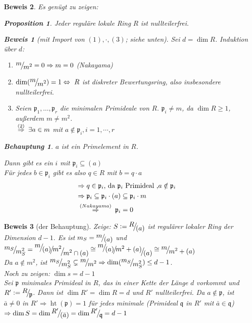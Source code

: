 \documentclass[a4paper,12pt]{report}
\theoremstyle{break}
\newtheorem{Prop}[Def]{Proposition}
\theoremstyle{nonumberbreak}
\newtheorem{Beh}{Behauptung}
\theoremstyle{nonumberplain}
\newtheorem{Bew}{Beweis}
\newcommand{\defeqr}[0]{\mathrel{\mathop:}=}
\newcommand{\folgtwegen}[1]{\ensuremath{\DOTSB\;\stackrel{#1}{\Rightarrow}\;}}
\DeclareMathOperator{\height}{ht}
\newcommand{\FakRaum}[2]{
  \raisebox{0.7ex}{\ensuremath{#1}}
  \ensuremath{\mkern-3mu}\big/\ensuremath{\mkern-3mu}
  \raisebox{-0.6ex}{\ensuremath{#2}}}
\begin{document}
\begin{Bew}
  Es genügt zu zeigen:
  \begin{Prop}
    \label{prop:17.5}
    Jeder reguläre lokale Ring $R$ ist nullteilerfrei.
  \end{Prop}
  \begin{Bew}[mit Import von $(1),\cdot,(3)$; siehe unten] Sei $d=\dim R$. Induktion über $d$: 
  \begin{enumerate}
  \item[d=0:] $\FakRaum{m}{m^2}=0\Rightarrow m=0$ (Nakayama)
  \item[d=1:] $\dim (\FakRaum{m}{m^2})=1\Leftrightarrow ~R$ ist diskreter Bewertungsring, also insbesondere nullteilerfrei.
  \item[d>1:] Seien $\mathfrak p_1,\dots,\mathfrak p_r$ die minimalen Primideale von $R$. $\mathfrak p_i\neq m$, da $\dim R\geq 1$,
    außerdem $m\neq m^2$. \\
    $\folgtwegen{(2)}\exists a\in m$ mit $a\notin \mathfrak p_i, i=1,\cdots,r$
  \end{enumerate}
  \begin{Beh}
    $a$ ist ein Primelement in $R$.
  \end{Beh}
  Dann gibt es ein $i$ mit $\mathfrak p_i\subseteq (a)$ \\
  Für jedes $b\in \mathfrak p_i$ gibt es also $q\in R$ mit $b=q\cdot a$
  \begin{align*}
    & \Rightarrow q\in \mathfrak p_i\text{, da $\mathfrak p_i$ Primideal ,} a\notin\mathfrak p_i \\
    & \Rightarrow \mathfrak p_i\subseteq \mathfrak p_i\cdot (a)\subseteq \mathfrak p_i\cdot m \\
    & \folgtwegen{(Nakayama)} \mathfrak p_i=0
  \end{align*}
  \end{Bew}
\end{Bew}
\begin{Bew}[der Behauptung]
  Zeige: $S\defeqr \FakRaum{R}{(a)}$ ist regulärer lokaler Ring der Dimension $d-1$.
  Es ist $m_S=\FakRaum{m}{(a)}$ und $\FakRaum{m_S}{m_S^2}=\FakRaum{\FakRaum{m}{(a)}}{\FakRaum{m^2}{m^2\cap (a)}}\cong
  \FakRaum{\FakRaum{m}{(a)}}{\FakRaum{m^2+(a)}{(a)}}\cong\FakRaum{m}{m^2+(a)}$ \\
  Da $a\notin m^2$, ist $\FakRaum{m_S}{m_S^2}\subsetneq\FakRaum{m}{m^2}\Rightarrow\dim(\FakRaum{m_S}{m_S^2})\leq d-1$. \\
  Noch zu zeigen: $\dim s=d-1$\\
  Sei $\mathfrak p$ minimales Primideal in $R$, das in einer Kette der Länge $d$ vorkommt und $R'\defeqr\FakRaum{R}{\mathfrak p}$.
  Dann ist $\dim R'=\dim R=d$ und $R'$ nullteilerfrei. Da $a\notin \mathfrak p$, ist $\bar{a}\neq 0$ in $R'\Rightarrow\height(\mathfrak p)=1$ für jedes
  minimale (Primideal $\mathfrak q$ in $R'$ mit $\bar{a}\in\mathfrak q$)  \\
  $\Rightarrow\dim S=\dim\FakRaum{R'}{(\bar{a})}=\dim\FakRaum{R'}{\mathfrak q}=d-1$
\end{Bew}
\end{document}
